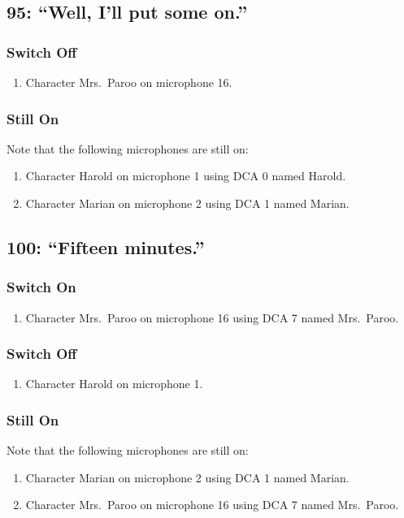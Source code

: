 \subsection* {95: ``Well, I'll put some on.''}
\subsubsection* {Switch Off}
\begin{enumerate}
\item Character Mrs.~Paroo on microphone 16.
\end{enumerate}
\subsubsection* {Still On}
Note that the following microphones are still on:
\begin{enumerate}
\item Character Harold on microphone 1 using DCA 0 named Harold.
\item Character Marian on microphone 2 using DCA 1 named Marian.
\end{enumerate}
\subsection* {100: ``Fifteen minutes.''}
\subsubsection* {Switch On}
\begin{enumerate}
\item Character Mrs.~Paroo on microphone 16 using DCA 7 named Mrs.~Paroo.
\end{enumerate}
\subsubsection* {Switch Off}
\begin{enumerate}
\item Character Harold on microphone 1.
\end{enumerate}
\subsubsection* {Still On}
Note that the following microphones are still on:
\begin{enumerate}
\item Character Marian on microphone 2 using DCA 1 named Marian.
\item Character Mrs.~Paroo on microphone 16 using DCA 7 named Mrs.~Paroo.
\end{enumerate}
